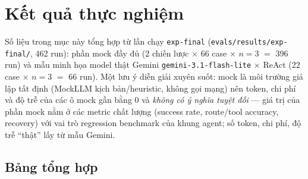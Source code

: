\section{Kết quả thực nghiệm}
\label{sec:ket-qua}

Số liệu trong mục này tổng hợp từ lần chạy \texttt{exp-final}
(\texttt{evals/results/exp-final/}, 462 run): phần mock đầy đủ (2 chiến
lược $\times$ 66 case $\times$ $n=3$ $=$ 396 run) và mẫu minh họa model
thật Gemini \texttt{gemini-3.1-flash-lite} $\times$ ReAct (22 case
$\times$ $n=3$ $=$ 66 run). Một lưu ý diễn giải xuyên suốt: mock là môi
trường giả lập tất định (MockLLM kịch bản/heuristic, không gọi mạng) nên
token, chi phí và độ trễ của các ô mock gần bằng 0 và \emph{không có ý
nghĩa tuyệt đối} --- giá trị của phần mock nằm ở các metric chất lượng
(success rate, route/tool accuracy, recovery) với vai trò regression
benchmark của khung agent; số token, chi phí, độ trễ ``thật'' lấy từ mẫu
Gemini.

\subsection{Bảng tổng hợp}

